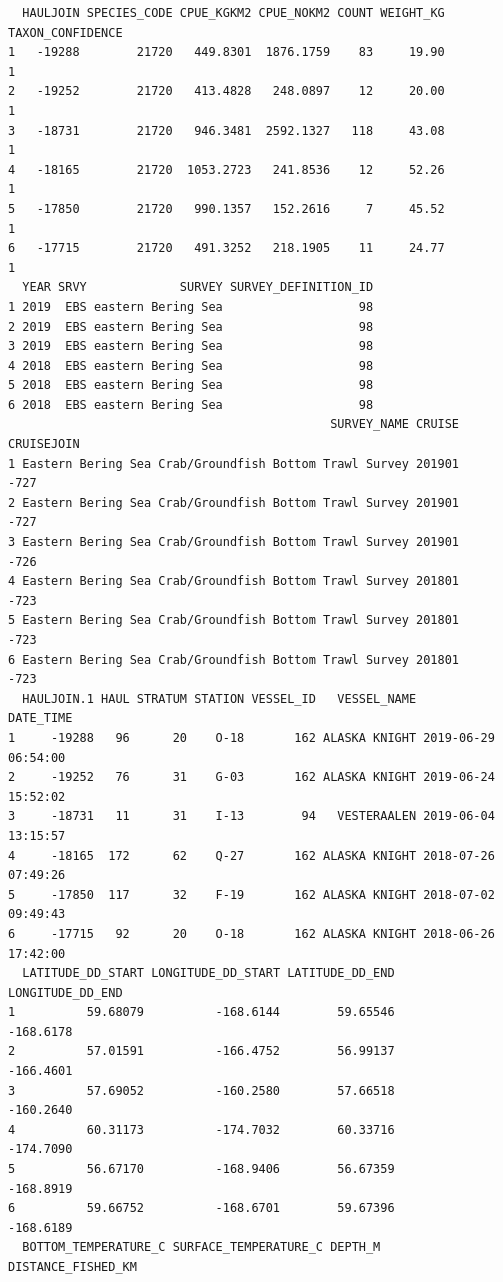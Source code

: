 \documentclass[
  letterpaper,
  oneside,
  open=any]{scrbook}
\begin{document}
\begin{verbatim}
  HAULJOIN SPECIES_CODE CPUE_KGKM2 CPUE_NOKM2 COUNT WEIGHT_KG TAXON_CONFIDENCE
1   -19288        21720   449.8301  1876.1759    83     19.90                1
2   -19252        21720   413.4828   248.0897    12     20.00                1
3   -18731        21720   946.3481  2592.1327   118     43.08                1
4   -18165        21720  1053.2723   241.8536    12     52.26                1
5   -17850        21720   990.1357   152.2616     7     45.52                1
6   -17715        21720   491.3252   218.1905    11     24.77                1
  YEAR SRVY             SURVEY SURVEY_DEFINITION_ID
1 2019  EBS eastern Bering Sea                   98
2 2019  EBS eastern Bering Sea                   98
3 2019  EBS eastern Bering Sea                   98
4 2018  EBS eastern Bering Sea                   98
5 2018  EBS eastern Bering Sea                   98
6 2018  EBS eastern Bering Sea                   98
                                             SURVEY_NAME CRUISE CRUISEJOIN
1 Eastern Bering Sea Crab/Groundfish Bottom Trawl Survey 201901       -727
2 Eastern Bering Sea Crab/Groundfish Bottom Trawl Survey 201901       -727
3 Eastern Bering Sea Crab/Groundfish Bottom Trawl Survey 201901       -726
4 Eastern Bering Sea Crab/Groundfish Bottom Trawl Survey 201801       -723
5 Eastern Bering Sea Crab/Groundfish Bottom Trawl Survey 201801       -723
6 Eastern Bering Sea Crab/Groundfish Bottom Trawl Survey 201801       -723
  HAULJOIN.1 HAUL STRATUM STATION VESSEL_ID   VESSEL_NAME           DATE_TIME
1     -19288   96      20    O-18       162 ALASKA KNIGHT 2019-06-29 06:54:00
2     -19252   76      31    G-03       162 ALASKA KNIGHT 2019-06-24 15:52:02
3     -18731   11      31    I-13        94   VESTERAALEN 2019-06-04 13:15:57
4     -18165  172      62    Q-27       162 ALASKA KNIGHT 2018-07-26 07:49:26
5     -17850  117      32    F-19       162 ALASKA KNIGHT 2018-07-02 09:49:43
6     -17715   92      20    O-18       162 ALASKA KNIGHT 2018-06-26 17:42:00
  LATITUDE_DD_START LONGITUDE_DD_START LATITUDE_DD_END LONGITUDE_DD_END
1          59.68079          -168.6144        59.65546        -168.6178
2          57.01591          -166.4752        56.99137        -166.4601
3          57.69052          -160.2580        57.66518        -160.2640
4          60.31173          -174.7032        60.33716        -174.7090
5          56.67170          -168.9406        56.67359        -168.8919
6          59.66752          -168.6701        59.67396        -168.6189
  BOTTOM_TEMPERATURE_C SURFACE_TEMPERATURE_C DEPTH_M DISTANCE_FISHED_KM

\end{verbatim}
\end{document}
